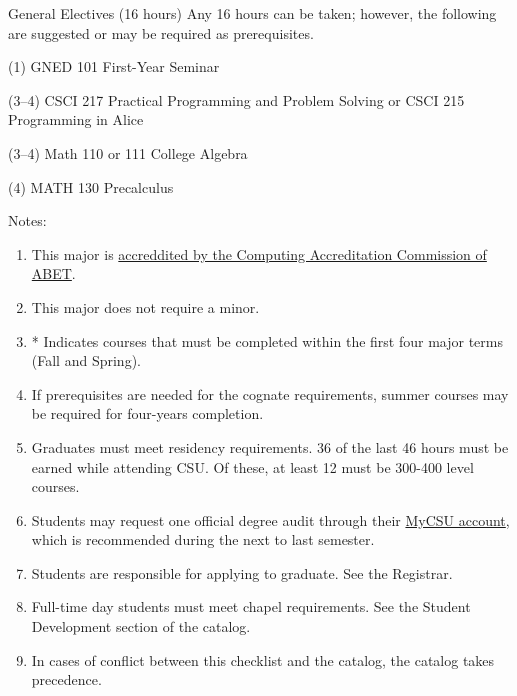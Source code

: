 \begin{reqgroup}{General Electives (16 hours)}
Any 16 hours can be taken; however, the following are suggested or may be required as prerequisites.
\begin{checklist}
\begin{minipage}[t]{\linewidth}
	\item (1)	GNED 101	First-Year Seminar
	\item (3--4)	CSCI 217	Practical Programming and Problem Solving or CSCI 215	Programming in Alice
	\item (3--4) Math 110 or 111 College Algebra
	\item (4) MATH 130 Precalculus
	\blankReq
\end{minipage}
\end{checklist}
\end{reqgroup}

Notes:%
\begin{enumerate}\footnotesize
	\item This major is
		\href{https://www.abet.org/accreditation/what-is-accreditation/why-abet-accreditation-matters/}{accreddited by the Computing Accreditation Commission of ABET}.
	\item This major does not require a minor.
	\item * Indicates courses that must be completed within the first four major terms (Fall and Spring).
	\item If prerequisites are needed for the cognate requirements, summer courses may be required for four-years completion.
	\item Graduates must meet residency requirements. 36 of the last 46 hours must be earned while attending CSU. Of these, at least 12 must be 300-400 level courses.
	\item Students may request one official degree audit through their \href{https://portal.csuniv.edu/}{MyCSU account}, which is recommended during the next to last semester.
	\item Students are responsible for applying to graduate. See the Registrar.
	\item Full-time day students must meet chapel requirements. See the Student Development section of the catalog.
	\item In cases of conflict between this checklist and the catalog, the catalog takes precedence.
\end{enumerate}